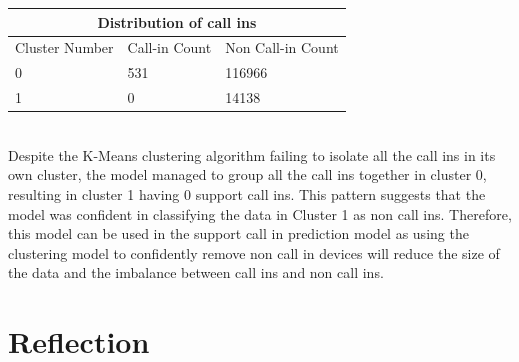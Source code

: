 \documentclass{article}
\begin{document}
\begin{center}
    \begin{tabular}{ |p{3cm}||p{3cm}|p{3cm}| }
        \hline
        \multicolumn{3}{|c|}{Distribution of call ins} \\
        \hline
        Cluster Number & Call-in Count & Non Call-in Count \\
        \hline
        0 & 531 & 116966\\
        1 & 0 & 14138\\
        \hline
    \end{tabular}
\end{center}

\noindent
\\
Despite the K-Means clustering algorithm failing to isolate all the call ins in its own cluster, the model managed to group all the call ins together in cluster 0, resulting in cluster 1 having 0 support call ins. This pattern suggests that the model was confident in classifying the data in Cluster 1 as non call ins. Therefore, this model can be used in the support call in prediction model as using the clustering model to confidently remove non call in devices will reduce the size of the data and the imbalance between call ins and non call ins.

\newpage
\section{Reflection}
\end{document}
